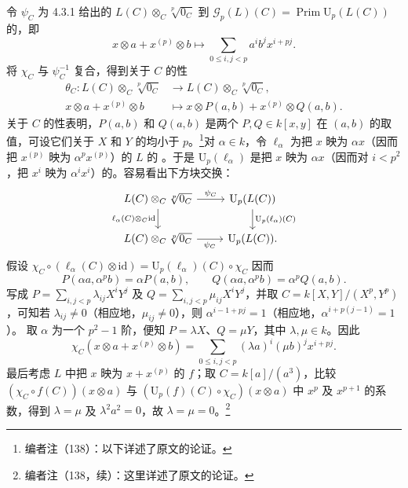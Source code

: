 令 $\psi_C$ 为 4.3.1 给出的 $L(C)\otimes_C\sqrt[p]{0_C}$ 到 $\mathscr G_p(L)(C)=\operatorname{Prim}\mathrm U_p(L(C))$ 的，即
\[
x\otimes a+x^{(p)}\otimes b\longmapsto\sum_{0\leq i,j<p}a^ib^jx^{i+pj}.
\]
将 $\chi_C$ 与 $\psi_C^{-1}$ 复合，得到关于 $C$ 的性
\[
\begin{aligned}
\theta_C:L(C)\otimes_C\sqrt[p]{0_C}&\longrightarrow L(C)\otimes_C\sqrt[p]{0_C},\\
x\otimes a+x^{(p)}\otimes b&\longmapsto x\otimes P(a,b)+x^{(p)}\otimes Q(a,b).
\end{aligned}
\]
关于 $C$ 的性表明，$P(a,b)$ 和 $Q(a,b)$ 是两个 $P,Q\in k[x,y]$ 在 $(a,b)$ 的取值，可设它们关于 $X$ 和 $Y$ 的均小于 $p$。\footnote{编者注（138）：以下详述了原文的论证。}对 $\alpha\in k$，令 $\ell_\alpha$ 为把 $x$ 映为 $\alpha x$（因而把 $x^{(p)}$ 映为 $\alpha^px^{(p)}$）的 $L$ 的 。于是 $\mathrm U_p(\ell_\alpha)$ 是把 $x$ 映为 $\alpha x$（因而对 $i<p^2$，把 $x^i$ 映为 $\alpha^ix^i$）的。容易看出下方块交换：
\[
\begin{tikzcd}
L(C)\otimes_C\sqrt[p]{0_C}\arrow[r,"\psi_C"]\arrow[d,"\ell_\alpha(C)\otimes_C\mathrm{id}"']&\mathrm U_p(L(C))\arrow[d,"\mathrm U_p(\ell_\alpha)(C)"]\\
L(C)\otimes_C\sqrt[p]{0_C}\arrow[r,"\psi_C"']&\mathrm U_p(L(C)).
\end{tikzcd}
\]
假设 $\chi_C\circ(\ell_\alpha(C)\otimes\mathrm{id})=\mathrm U_p(\ell_\alpha)(C)\circ\chi_C$ 因而
\[
P(\alpha a,\alpha^pb)=\alpha P(a,b),\qquad
Q(\alpha a,\alpha^pb)=\alpha^pQ(a,b).
\]
写成 $P=\sum_{i,j<p}\lambda_{ij}X^iY^j$ 及 $Q=\sum_{i,j<p}\mu_{ij}X^iY^j$，并取 $C=k[X,Y]/(X^p,Y^p)$，可知若 $\lambda_{ij}\ne0$（相应地，$\mu_{ij}\ne0$），则 $\alpha^{i-1+pj}=1$（相应地，$\alpha^{i+p(j-1)}=1$）。
取 $\alpha$ 为一个 $p^2-1$ 阶，便知 $P=\lambda X$、$Q=\mu Y$，其中 $\lambda,\mu\in k$。因此
\[
\chi_C(x\otimes a+x^{(p)}\otimes b)=\sum_{0\leq i,j<p}(\lambda a)^i(\mu b)^jx^{i+pj}.
\]
最后考虑 $L$ 中把 $x$ 映为 $x+x^{(p)}$ 的 $f$；取 $C=k[a]/(a^3)$，比较 $(\chi_C\circ f(C))(x\otimes a)$ 与 $(\mathrm U_p(f)(C)\circ\chi_C)(x\otimes a)$ 中 $x^p$ 及 $x^{p+1}$ 的系数，得到 $\lambda=\mu$ 及 $\lambda^2a^2=0$，故 $\lambda=\mu=0$。\footnote{编者注（138，续）：这里详述了原文的论证。}

